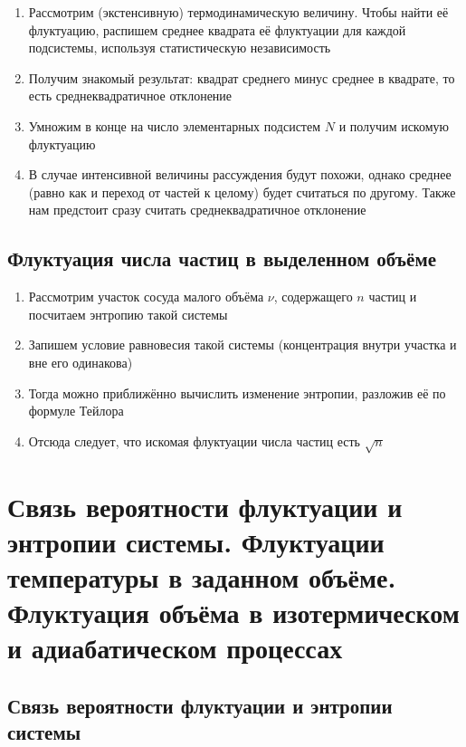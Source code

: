 \documentclass[a4paper, 14pt]{article}
\begin{document}
    \begin{enumerate}
        \item Рассмотрим (экстенсивную) термодинамическую величину.
        Чтобы найти её флуктуацию, распишем среднее квадрата её флуктуации для каждой подсистемы, используя
        статистическую независимость
        \item Получим знакомый результат: квадрат среднего минус среднее в квадрате, то есть среднеквадратичное
        отклонение
        \item Умножим в конце на число элементарных подсистем $N$ и получим искомую флуктуацию
        \item В случае интенсивной величины рассуждения будут похожи, однако среднее (равно как и переход от частей
        к целому) будет считаться по другому.
        Также нам предстоит сразу считать среднеквадратичное отклонение
    \end{enumerate}
    
    \subsection{Флуктуация числа частиц в выделенном объёме}
    
    \begin{enumerate}
        \item Рассмотрим участок сосуда малого объёма $\nu$, содержащего $n$ частиц и посчитаем энтропию такой системы
        \item Запишем условие равновесия такой системы (концентрация внутри участка и вне его одинакова)
        \item Тогда можно приближённо вычислить изменение энтропии, разложив её по формуле Тейлора
        \item Отсюда следует, что искомая флуктуации числа частиц есть $\sqrt{n}$
    \end{enumerate}
    
    \section{Связь вероятности флуктуации и энтропии системы.
    Флуктуации температуры в заданном объёме.
    Флуктуация объёма в изотермическом и адиабатическом процессах}
    
    \subsection{Связь вероятности флуктуации и энтропии системы}
    
\end{document}
